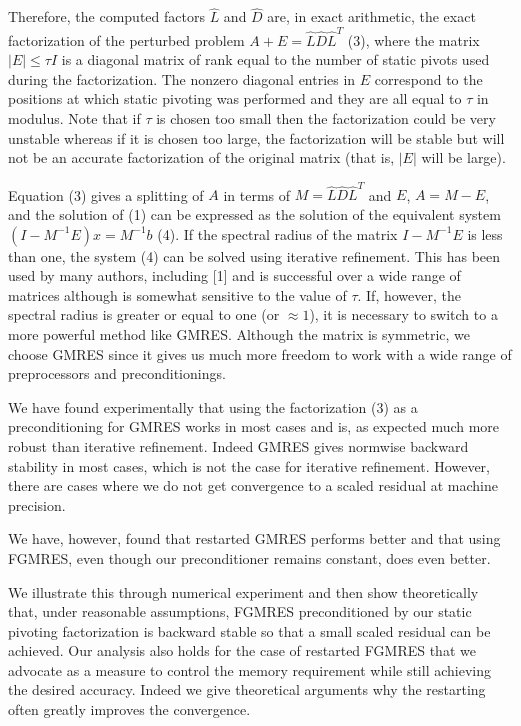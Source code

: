 \documentclass[twosided]{report}
\begin{document}
Therefore, the computed factors $\hat{L}$ and
$\hat{D}$ are, in exact arithmetic, the exact factorization
of the perturbed problem
$A + E = \hat{L} \hat{D} \hat{L}^T$ (3),
where the matrix
$|E| \le \tau I$ is a diagonal matrix of rank equal to the
number of static pivots used during the factorization. The
nonzero diagonal entries in $E$ correspond to the positions
at which static pivoting was performed and they are all
equal to $\tau$ in modulus. Note that if $\tau$ is chosen
too small then the factorization could be very unstable
whereas if it is chosen too large, the factorization will be
stable but will not be an accurate factorization of the
original matrix (that is, $|E|$ will be large).

Equation (3)
gives a splitting of $A$ in terms of
$M = \hat{L} \hat{D} \hat{L}^T$ and $E$,
$A = M - E$,
and the solution of (1) can be expressed as the
solution of the equivalent system
$(I - M^{-1} E) x = M^{-1}b$ (4).
If the spectral radius of the matrix
$I - M^{-1} E $
is less than one, the system (4) can be
solved using iterative refinement. This has been used by
many authors, including [1] and is successful
over a wide range of matrices although is somewhat sensitive
to the value of $\tau$. If, however, the spectral radius is
greater or equal to one (or $\approx 1$), it is necessary to
switch to a more powerful method like GMRES. Although the
matrix is symmetric, we choose GMRES since it gives us much
more freedom to work with a wide range of preprocessors and
preconditionings.

We have found experimentally that using
the factorization (3) as a preconditioning for
GMRES works in most cases and is, as expected much more
robust than iterative refinement. Indeed GMRES gives
normwise backward stability in most cases, which is not the
case for iterative refinement. However, there are cases
where we do not get convergence to a scaled residual at
machine precision.

We have, however, found that restarted
GMRES performs better and that using FGMRES, even though our
preconditioner remains constant, does even better.

We
illustrate this through numerical experiment and then show
theoretically that, under reasonable assumptions, FGMRES
preconditioned by our static pivoting factorization is
backward stable so that a small scaled residual can be
achieved. Our analysis also holds for the case of restarted
FGMRES that we advocate as a measure to control the memory
requirement while still achieving the desired accuracy.
Indeed we give theoretical arguments why the restarting
often greatly improves the convergence.
\end{document}
